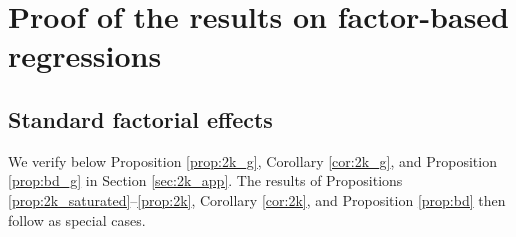 \documentclass[11pt]{article}
\theoremstyle{definition}
\begin{document}
% 

\section{Proof of the results on factor-based regressions}\label{sec:factor_proof}

\subsection{Standard factorial effects}
We verify below Proposition \ref{prop:2k_g}, Corollary \ref{cor:2k_g}, and Proposition \ref{prop:bd_g} in Section \ref{sec:2k_app}. 
The results of Propositions \ref{prop:2k_saturated}--\ref{prop:2k}, Corollary \ref{cor:2k}, and Proposition \ref{prop:bd} then follow as special cases. 
\end{document}
